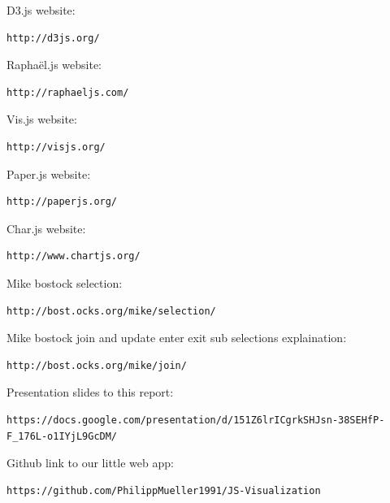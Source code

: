 \documentclass{bioinfo}
\begin{document}
\begin{thebibliography}{}
 D3.js website: \begin{verbatim}http://d3js.org/\end{verbatim}
 Rapha\"el.js website: \begin{verbatim}http://raphaeljs.com/\end{verbatim}
 Vis.js website: \begin{verbatim}http://visjs.org/\end{verbatim}
 Paper.js website: \begin{verbatim}http://paperjs.org/\end{verbatim}
 Char.js website: \begin{verbatim}http://www.chartjs.org/\end{verbatim}
 Mike bostock selection: \begin{verbatim}http://bost.ocks.org/mike/selection/\end{verbatim}
 Mike bostock join and update enter exit sub selections explaination: \begin{verbatim}http://bost.ocks.org/mike/join/\end{verbatim}
 Presentation slides to this report: \begin{verbatim}https://docs.google.com/presentation/d/151Z6lrICgrkSHJsn-38SEHfP-F_176L-o1IYjL9GcDM/\end{verbatim}
 Github link to our little web app: \begin{verbatim}https://github.com/PhilippMueller1991/JS-Visualization\end{verbatim}
\end{thebibliography}
\end{document}
